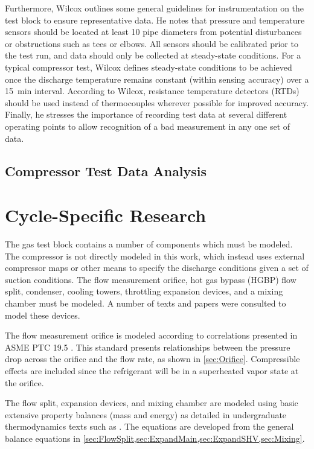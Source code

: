 Furthermore, Wilcox outlines some general guidelines 
for instrumentation on the test block to ensure representative data.  
He notes that pressure and temperature sensors should be located 
at least 10 pipe diameters from potential disturbances or obstructions such as tees or elbows.  
All sensors should be calibrated prior to the test run, 
and data should only be collected at steady-state conditions.  
For a typical compressor test, Wilcox defines steady-state conditions to be achieved 
once the discharge temperature remains constant (within sensing accuracy) over a \SI{15}{\minute} interval. 
According to Wilcox, resistance temperature detectors (RTDs)%
should be used instead of thermocouples wherever possible for improved accuracy. 
Finally, he stresses the importance of recording test data at several different operating points 
to allow recognition of a bad measurement in any one set of data.

\subsection{Compressor Test Data Analysis}

\section{Cycle-Specific Research}
The  gas test block contains a number of components which must be modeled. 
The compressor is not directly modeled in this work, 
which instead uses external compressor maps or other means 
to specify the discharge conditions given a set of suction conditions. 
The flow measurement orifice, hot gas bypass (HGBP)%
 flow split, condenser, cooling towers, 
throttling expansion devices, and a mixing chamber must be modeled. 
A number of texts and papers were consulted to model these devices.

The flow measurement orifice is modeled according to correlations presented in 
ASME PTC 19.5 \citep{ptc19}. 
This standard presents relationships between 
the pressure drop across the orifice and the flow rate, as shown in \cref{sec:Orifice}. 
Compressible effects are included since the refrigerant will be in a 
superheated vapor state at the orifice.

The flow split, expansion devices, and mixing chamber are modeled using 
basic extensive property balances (mass and energy) as detailed in 
undergraduate thermodynamics texts such as \citet{cengel2011}. 
The equations are developed from the general balance equations 
in \cref{sec:FlowSplit,sec:ExpandMain,sec:ExpandSHV,sec:Mixing}.

